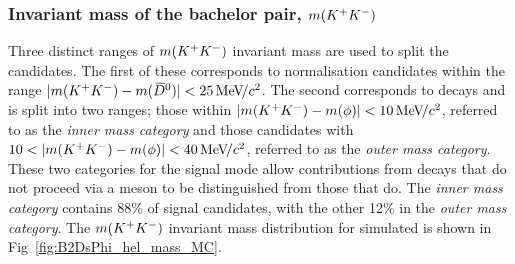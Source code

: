 \subsubsection{Invariant mass of the bachelor \Kp\Km pair, $m({{K}^+}{{K}^-})$} 
Three distinct ranges of $m({{K}^+}{{K}^-})$ invariant mass are used to split the candidates. The first of these corresponds to normalisation \decay{\Bp}{\Dsp\Dzb} candidates within the range $|m({{K}^+}{{K}^-})-m({{\kern 0.2em\overline{\kern -0.2em D}{}}{}^0})|<25 {\mathrm{\,Me\kern -0.1em V\!/}c^2}$. The second corresponds to \decay{\Bp}{\Dsp\phiz} decays and is split into two ranges; those within $|m({{K}^+}{{K}^-})-m(\phi)|<10{\mathrm{\,Me\kern -0.1em V\!/}c^2}$, referred to as the \emph{inner \phiz mass category} and those candidates with $10<|m(\Kp\Km)-m(\phiz)|<40\mevcc$, referred to as the \emph{outer \phiz mass category}. These two categories for the signal mode allow contributions from decays that do not proceed via a \phiz meson to be distinguished from those that do. The \emph{inner \phiz mass category} contains 88\% of signal \decay{\Bp}{\Dsp\phiz} candidates, with the other 12\% in the \emph{outer \phiz mass category}. The $m({{K}^+}{{K}^-})$ invariant mass distribution for simulated \decay{\Bp}{\Dsp\phiz} is shown in Fig~\ref{fig:B2DsPhi_hel_mass_MC}.



